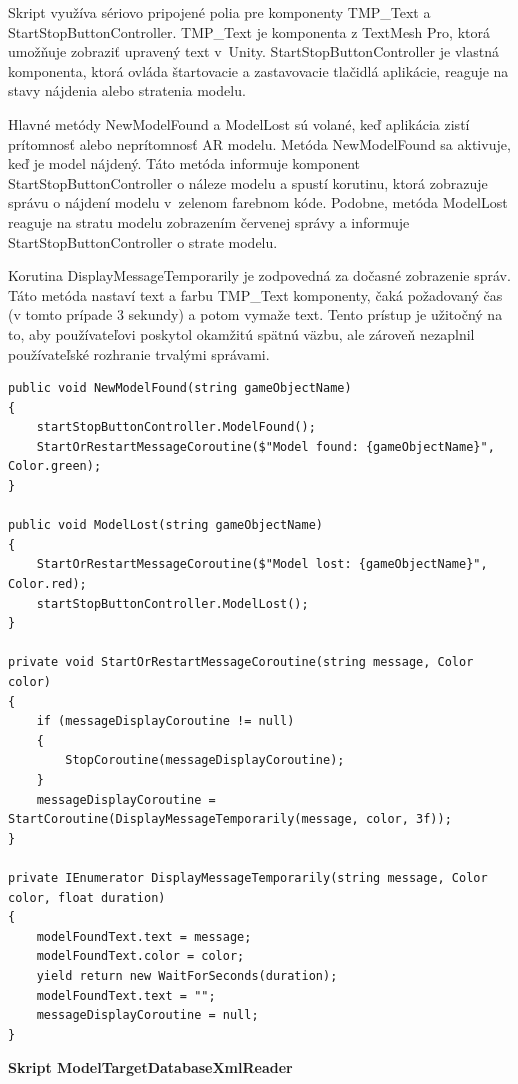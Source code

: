 Skript využíva sériovo pripojené polia pre komponenty TMP\_Text a StartStopButtonController. TMP\_Text je komponenta z TextMesh Pro, ktorá umožňuje zobraziť upravený text v~Unity. StartStopButtonController je vlastná komponenta, ktorá ovláda štartovacie a zastavovacie tlačidlá aplikácie, reaguje na stavy nájdenia alebo stratenia modelu.

Hlavné metódy NewModelFound a ModelLost sú volané, keď aplikácia zistí prítomnosť alebo neprítomnosť AR modelu. Metóda NewModelFound sa aktivuje, keď je model nájdený. Táto metóda informuje komponent StartStopButtonController o náleze modelu a spustí korutinu, ktorá zobrazuje správu o nájdení modelu v~zelenom farebnom kóde. Podobne, metóda ModelLost reaguje na stratu modelu zobrazením červenej správy a informuje StartStopButtonController o strate modelu.

Korutina DisplayMessageTemporarily je zodpovedná za dočasné zobrazenie správ. Táto metóda nastaví text a farbu TMP\_Text komponenty, čaká požadovaný čas (v tomto prípade 3 sekundy) a potom vymaže text. Tento prístup je užitočný na to, aby používateľovi poskytol okamžitú spätnú väzbu, ale zároveň nezaplnil používateľské rozhranie trvalými správami.

\lstset{style=Csharp}
\begin{lstlisting}[caption={ModelFoundController Class - Ovladanie správ pri nájdeni modelu}, label=modelFoundController]
public void NewModelFound(string gameObjectName)
{
    startStopButtonController.ModelFound();
    StartOrRestartMessageCoroutine($"Model found: {gameObjectName}", Color.green);
}

public void ModelLost(string gameObjectName)
{
    StartOrRestartMessageCoroutine($"Model lost: {gameObjectName}", Color.red);
    startStopButtonController.ModelLost();
}

private void StartOrRestartMessageCoroutine(string message, Color color)
{
    if (messageDisplayCoroutine != null)
    {
        StopCoroutine(messageDisplayCoroutine);
    }
    messageDisplayCoroutine = StartCoroutine(DisplayMessageTemporarily(message, color, 3f));
}

private IEnumerator DisplayMessageTemporarily(string message, Color color, float duration)
{
    modelFoundText.text = message;
    modelFoundText.color = color;
    yield return new WaitForSeconds(duration);
    modelFoundText.text = "";
    messageDisplayCoroutine = null;
}
\end{lstlisting} 

{\large\textbf{Skript ModelTargetDatabaseXmlReader}}

